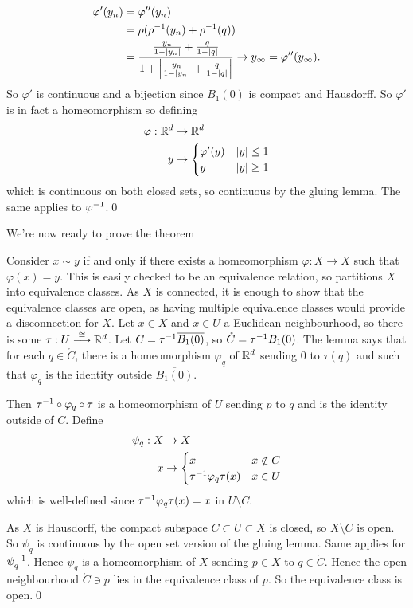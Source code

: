 \documentclass{article}
\newcommand{\homeo}{\overset{\cong}{\longrightarrow}}
\begin{document}
\begin{align*}
	\varphi'(y_n) &= \varphi''(y_n) \\
		      &= \rho({\rho}^{-1} (y_n)+{\rho}^{-1}(q)) \\
		      &= \frac{\frac{y_n}{1-|y_n|}+\frac q{1-|q|}}{1+\left|\frac{y_n}{1-|y_n|}+\frac q{1-|q|}\right|}\to y_\infty=\varphi''(y_\infty).
\end{align*}
So $ \varphi' $ is continuous and a bijection since $ \overline{B_1(0)} $ is compact and Hausdorff. So $ \varphi' $ is in fact a homeomorphism so defining
\begin{align*}
	\varphi : \mathbb{R}^d &\to \mathbb{R}^d \\
	y &\to \begin{cases}
		\varphi'(y) & |y| \le 1 \\
		y & |y| \ge 1
	\end{cases}
\end{align*}
which is continuous on both closed sets, so continuous by the gluing lemma. The same applies to $ {\varphi}^{-1} $.\qed
\par
We're now ready to prove the theorem\par
\pf Consider $ x\sim y $ if and only if there exists a homeomorphism $ \varphi:X\to X $ such that $ \varphi(x) = y $. This is easily checked to be an equivalence relation, so partitions $ X $ into equivalence classes. As $ X $ is connected, it is enough to show that the equivalence classes are open, as having multiple equivalence classes would provide a disconnection for $ X $. Let $ x\in X $ and $ x\in U $ a Euclidean neighbourhood, so there is some $ \tau:U\homeo \R^d $. Let $ C= {\tau}^{-1} \overline{B_1(0)} $, so $ \mathring C = {\tau}^{-1} B_1(0) $. The lemma says that for each $ q\in \mathring C $, there is a homeomorphism $ \varphi_q $ of $ \mathbb{R}^d $ sending $ 0 $ to $ \tau(q) $ and such that $ \varphi_q $ is the identity outside $ \overline{B_1(0)} $. \par
Then $ {\tau}^{-1} \circ\varphi_q \circ \tau $ is a homeomorphism of $ U $ sending $ p $ to $ q $ and is the identity outside of $ C $. Define
\begin{align*}
	\psi_q:X &\to X \\
	x &\to \begin{cases}
		x & x\notin C \\
		{\tau}^{-1}\varphi_q\tau(x) & x \in U
	\end{cases}
\end{align*}
which is well-defined since $ {\tau}^{-1}\varphi_q\tau(x) = x $ in $ U\setminus C $.\par
As $ X $ is Hausdorff, the compact subspace $ C\subset U\subset X $ is closed, so $ X\setminus C $ is open. So $ \psi_q $ is continuous by the open set version of the gluing lemma. Same applies for $ {\psi}^{-1}_q $. Hence $ \psi_q $ is a homeomorphism of $ X $ sending $ p\in X $ to $ q\in \mathring C $. Hence the open neighbourhood $ \mathring C \ni p $ lies in the equivalence class of $ p $. So the equivalence class is open.\qed
\end{document}
